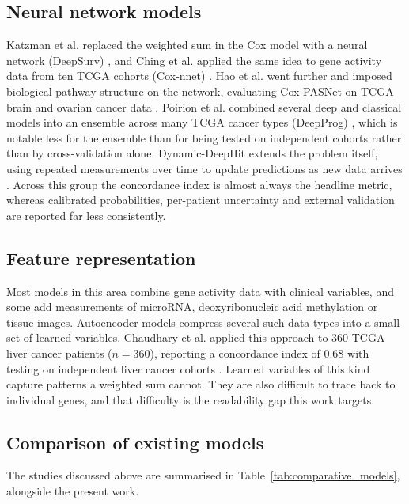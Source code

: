 \documentclass[10pt,a4paper]{article}
\begin{document}
\subsection{Neural network models}

Katzman et al. replaced the weighted sum in the Cox model with a neural network
(DeepSurv) \citep{katzman2018deepsurv}, and Ching et al. applied the same idea to
gene activity data from ten TCGA cohorts (Cox-nnet) \citep{ching2018coxnnet}. Hao
et al. went further and imposed biological pathway structure on the network,
evaluating Cox-PASNet on TCGA brain and ovarian cancer data
\citep{hao2019coxpasnet}. Poirion et al. combined several deep and classical models
into an ensemble across many TCGA cancer types (DeepProg)
\citep{poirion2021deepprog}, which is notable less for the ensemble than for being
tested on independent cohorts rather than by cross-validation alone.
Dynamic-DeepHit extends the problem itself, using repeated measurements over time
to update predictions as new data arrives \citep{lee2020dynamic}. Across this group
the concordance index is almost always the headline metric, whereas calibrated
probabilities, per-patient uncertainty and external validation are reported far
less consistently.

\subsection{Feature representation}

Most models in this area combine gene activity data with clinical variables, and
some add measurements of microRNA, deoxyribonucleic acid methylation or tissue
images. Autoencoder models compress several such data types into a small set of
learned variables. Chaudhary et al. applied this approach to 360 TCGA liver cancer
patients ($n = 360$), reporting a concordance index of 0.68 with testing on
independent liver cancer cohorts \citep{chaudhary2018deep}. Learned variables of
this kind capture patterns a weighted sum cannot. They are also difficult to trace
back to individual genes, and that difficulty is the readability gap this work
targets.

\subsection{Comparison of existing models}

The studies discussed above are summarised in
Table~\ref{tab:comparative_models}, alongside the present work.
\end{document}

